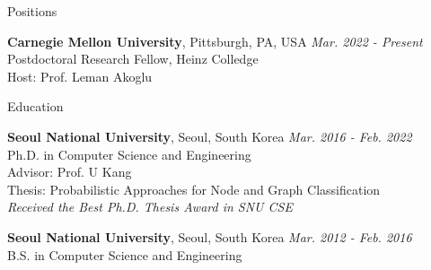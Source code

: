 \documentclass{resume} %
\begin{document}

\begin{rSection}{Positions}

\textbf{Carnegie Mellon University}, Pittsburgh, PA, USA \hfill \emph{Mar. 2022 - Present} \\ 
Postdoctoral Research Fellow, Heinz Colledge \\
Host: Prof. Leman Akoglu

\end{rSection}


\begin{rSection}{Education}

\textbf{Seoul National University}, Seoul, South Korea \hfill \emph{Mar. 2016 - Feb. 2022} \\ 
Ph.D. in Computer Science and Engineering \\
Advisor: Prof. U Kang \\
Thesis: Probabilistic Approaches for Node and Graph Classification \\
\emph{Received the Best Ph.D. Thesis Award in SNU CSE}

\textbf{Seoul National University}, Seoul, South Korea \hfill \emph{Mar. 2012 - Feb. 2016} \\ 
B.S. in Computer Science and Engineering

\end{rSection}

\end{document}
